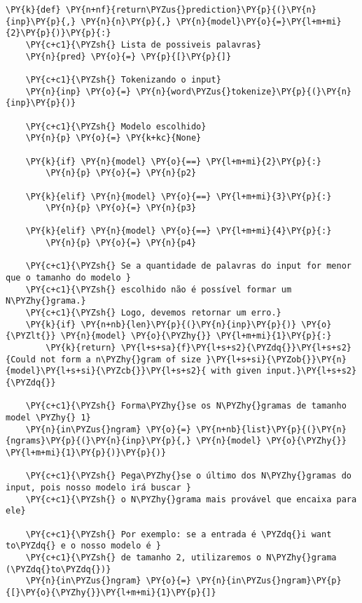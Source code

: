 \documentclass[a4paper,11pt,final]{article}
\begin{document}
\begin{Verbatim}[commandchars=\\\{\},frame=single,fontsize=\small, xleftmargin=0.5em]
\PY{k}{def} \PY{n+nf}{return\PYZus{}prediction}\PY{p}{(}\PY{n}{inp}\PY{p}{,} \PY{n}{n}\PY{p}{,} \PY{n}{model}\PY{o}{=}\PY{l+m+mi}{2}\PY{p}{)}\PY{p}{:}
    \PY{c+c1}{\PYZsh{} Lista de possiveis palavras}
    \PY{n}{pred} \PY{o}{=} \PY{p}{[}\PY{p}{]}
    
    \PY{c+c1}{\PYZsh{} Tokenizando o input}
    \PY{n}{inp} \PY{o}{=} \PY{n}{word\PYZus{}tokenize}\PY{p}{(}\PY{n}{inp}\PY{p}{)}
    
    \PY{c+c1}{\PYZsh{} Modelo escolhido}
    \PY{n}{p} \PY{o}{=} \PY{k+kc}{None}
    
    \PY{k}{if} \PY{n}{model} \PY{o}{==} \PY{l+m+mi}{2}\PY{p}{:}
        \PY{n}{p} \PY{o}{=} \PY{n}{p2}
        
    \PY{k}{elif} \PY{n}{model} \PY{o}{==} \PY{l+m+mi}{3}\PY{p}{:}
        \PY{n}{p} \PY{o}{=} \PY{n}{p3}
                
    \PY{k}{elif} \PY{n}{model} \PY{o}{==} \PY{l+m+mi}{4}\PY{p}{:}
        \PY{n}{p} \PY{o}{=} \PY{n}{p4}
    
    \PY{c+c1}{\PYZsh{} Se a quantidade de palavras do input for menor que o tamanho do modelo }
    \PY{c+c1}{\PYZsh{} escolhido não é possível formar um N\PYZhy{}grama.}
    \PY{c+c1}{\PYZsh{} Logo, devemos retornar um erro.}
    \PY{k}{if} \PY{n+nb}{len}\PY{p}{(}\PY{n}{inp}\PY{p}{)} \PY{o}{\PYZlt{}} \PY{n}{model} \PY{o}{\PYZhy{}} \PY{l+m+mi}{1}\PY{p}{:}
        \PY{k}{return} \PY{l+s+sa}{f}\PY{l+s+s2}{\PYZdq{}}\PY{l+s+s2}{Could not form a n\PYZhy{}gram of size }\PY{l+s+si}{\PYZob{}}\PY{n}{model}\PY{l+s+si}{\PYZcb{}}\PY{l+s+s2}{ with given input.}\PY{l+s+s2}{\PYZdq{}}

    \PY{c+c1}{\PYZsh{} Forma\PYZhy{}se os N\PYZhy{}gramas de tamanho model \PYZhy{} 1}
    \PY{n}{in\PYZus{}ngram} \PY{o}{=} \PY{n+nb}{list}\PY{p}{(}\PY{n}{ngrams}\PY{p}{(}\PY{n}{inp}\PY{p}{,} \PY{n}{model} \PY{o}{\PYZhy{}} \PY{l+m+mi}{1}\PY{p}{)}\PY{p}{)}

    \PY{c+c1}{\PYZsh{} Pega\PYZhy{}se o último dos N\PYZhy{}gramas do input, pois nosso modelo irá buscar }
    \PY{c+c1}{\PYZsh{} o N\PYZhy{}grama mais provável que encaixa para ele}

    \PY{c+c1}{\PYZsh{} Por exemplo: se a entrada é \PYZdq{}i want to\PYZdq{} e o nosso modelo é }
    \PY{c+c1}{\PYZsh{} de tamanho 2, utilizaremos o N\PYZhy{}grama (\PYZdq{}to\PYZdq{})}
    \PY{n}{in\PYZus{}ngram} \PY{o}{=} \PY{n}{in\PYZus{}ngram}\PY{p}{[}\PY{o}{\PYZhy{}}\PY{l+m+mi}{1}\PY{p}{]}
    

\end{Verbatim}
\end{document}
